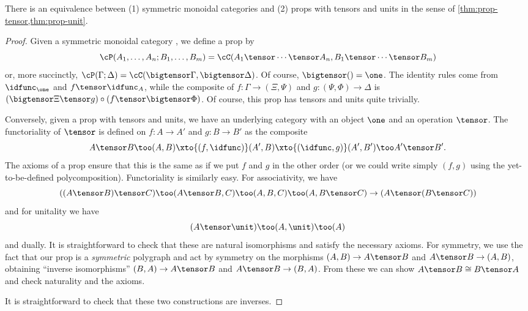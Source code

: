 \begin{thm}\label{thm:prop-smc}
  There is an equivalence between (1) symmetric monoidal categories and (2) props with tensors and units in the sense of \cref{thm:prop-tensor,thm:prop-unit}.
\end{thm}
\begin{proof}
  Given a symmetric monoidal category \cC, we define a prop \cP by
  \[ \cP(A_1,\dots,A_n ; B_1,\dots,B_m) = \cC(A_1\tensor \cdots\tensor A_n, B_1\tensor\cdots\tensor B_m)\]
  or, more succinctly, $\cP(\Gamma;\Delta) = \cC(\bigtensor\Gamma, \bigtensor\Delta)$.
  Of course, $\bigtensor() = \one$.
  The identity rules come from $\idfunc_\one$ and $f\tensor \idfunc_A$, while the composite of $f:\Gamma\to (\Xi,\Psi)$ and $g:(\Psi,\Phi)\to \Delta$ is $(\bigtensor\Xi \tensor g) \circ (f\tensor \bigtensor \Phi)$.
  Of course, this prop has tensors and units quite trivially.

  Conversely, given a prop with tensors and units, we have an underlying category with an object $\one$ and an operation $\tensor$.
  The functoriality of $\tensor$ is defined on $f:A\to A'$ and $g:B\to B'$ as the composite
  \[ A\tensor B \too (A,B) \xto{(f,\idfunc)} (A',B) \xto{(\idfunc,g)} (A',B') \too A'\tensor B'. \]
  The axioms of a prop ensure that this is the same as if we put $f$ and $g$ in the other order (or we could write simply $(f,g)$ using the yet-to-be-defined polycomposition).
  Functoriality is similarly easy.
  For associativity, we have
  \[ ((A\tensor B)\tensor C) \too (A\tensor B,C) \too (A,B,C) \too (A,B\tensor C) \to (A\tensor (B\tensor C)) \]
  and for unitality we have
  \[ (A\tensor \unit) \too (A,\unit) \too (A) \]
  and dually.
  It is straightforward to check that these are natural isomorphisms and satisfy the necessary axioms.
  For symmetry, we use the fact that our prop is a \emph{symmetric} polygraph and act by symmetry on the morphisms $(A,B)\to A\tensor B$ and $A\tensor B\to (A,B)$, obtaining ``inverse isomorphisms'' $(B,A) \to A\tensor B$ and $A\tensor B \to (B,A)$.
  From these we can show $A\tensor B \cong B\tensor A$ and check naturality and the axioms.

  It is straightforward to check that these two constructions are inverses.
\end{proof}

